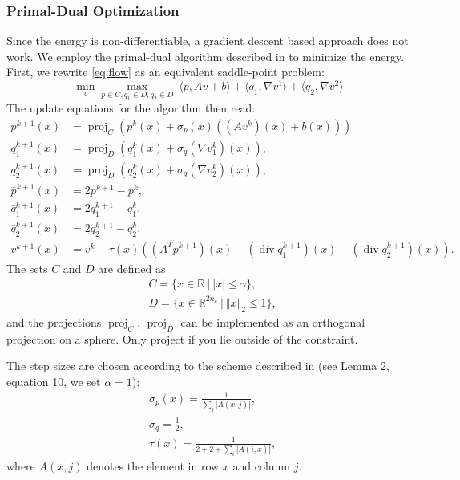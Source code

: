\documentclass[A4,12pt]{article}
\DeclareMathOperator{\divop}{div}
\DeclareMathOperator*{\proj}{proj}
\newcommand{\R}{\mathbb{R}}
\newcommand{\norm}[1]{\Vert #1 \Vert}
\providecommand{\iprod}[2]{\langle#1,#2\rangle}
\begin{document}
\subsubsection{Primal-Dual Optimization}
Since the energy is non-differentiable, a gradient descent based approach does not work. We employ the primal-dual algorithm described in \cite{Chambolle-Pock-jmiv11,Pock-Chambolle-iccv11} to minimize the energy. First, we rewrite \eqref{eq:flow} as an equivalent saddle-point problem:
\begin{equation}
\min_{v} \max_{p \in C,q_1 \in D,q_2 \in D} ~ \iprod{p}{Av + b} + \iprod{q_1}{\nabla v^1} + \iprod{q_2}{\nabla v^2}
\end{equation}
The update equations for the algorithm then read:
\begin{equation}
\begin{aligned}
p^{k+1}(x)&=\proj_C(p^k(x) + \sigma_p(x) ((Av^k)(x) + b(x))) \\
q_1^{k+1}(x)&=\proj_D(q_1^k(x) + \sigma_q (\nabla v_1^k)(x)),\\
q_2^{k+1}(x)&=\proj_D(q_2^k(x) + \sigma_q (\nabla v_2^k)(x)),\\
\bar p^{k+1}(x)&=2 p^{k+1} - p^k,\\
\bar q_1^{k+1}(x)&=2 q_1^{k+1} - q_1^k,\\
\bar q_2^{k+1}(x)&=2 q_2^{k+1} - q_2^k,\\
v^{k+1}(x)&=v^k - \tau(x) ((A^T \bar p^{k+1})(x) - (\divop \bar q_1^{k+1})(x) - (\divop \bar q_2^{k+1})(x) ).
\end{aligned}
\end{equation}
The sets $C$ and $D$ are defined as
\begin{equation}
\begin{aligned}
& C = \{x \in \R ~|~ |x| \leq \gamma \}, \\
& D = \{x \in \R^{2 n_c} ~|~ \norm{x}_2 \leq 1 \}, 
\end{aligned}
\end{equation}
and the projections $\proj_C$, $\proj_D$ can be implemented as an orthogonal projection on a sphere. Only project if you lie outside of the constraint.

The step sizes are chosen according to the scheme described in \cite{Pock-Chambolle-iccv11} (see Lemma 2, equation 10, we set $\alpha=1$):
\begin{equation}
  \begin{aligned}
    &\sigma_p(x) = \frac{1}{\sum_j |A(x,j)|}, \\
    &\sigma_q = \frac{1}{2},\\
    &\tau(x) = \frac{1}{2 + 2 + \sum_i |A(i,x)|},
  \end{aligned}
\end{equation}
where $A(x,j)$ denotes the element in row $x$ and column $j$.
\end{document}
